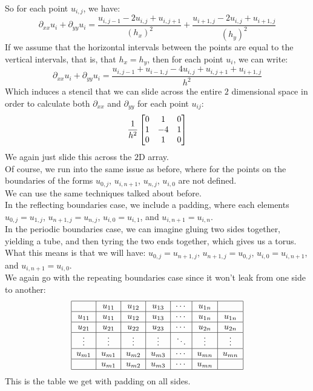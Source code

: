 \documentclass[12pt]{article}
\begin{document}
So for each point $u_{i, j}$, we have:
\[ \partial_{xx}u_i + \partial_{yy}u_i
= \dfrac{u_{i, j-1} -2u_{i, j} + u_{i, j+1}}{(h_x)^2} 
+ \dfrac{u_{i+1, j} -2u_{i, j} + u_{i+1, j}}{(h_y)^2} \]
If we assume that the horizontal intervals between 
the points are equal to the vertical intervals,
that is, that $h_x = h_y$,
then for each point $u_i$, we can write:
\[ \partial_{xx}u_i + \partial_{yy}u_i
= \dfrac{u_{i, j-1} + u_{i-1, j} -4u_{i, j} 
+ u_{i, j+1} + u_{i+1, j}}{h^2} \]
Which induces a stencil that we can slide
across the entire $2$ dimensional space
in order to calculate both $\partial_{xx}$
and $\partial_{yy}$ for each point $u_{ij}$:
\[ \dfrac{1}{h^2}
\begin{bmatrix} 0 & 1 & 0 \\ 1 & -4 & 1 \\ 0 & 1 & 0 \end{bmatrix} \]
We again just slide this across the $2$D array. \\

Of course, we run into the same issue as before,
where for the points on the boundaries
of the forms $u_{0, j}$, $u_{i, n+1}$,
$u_{n, j}$, $u_{i, 0}$ are not defined. \\
We can use the same techniques talked about before. \\
In the reflecting boundaries case,
we include a padding, where each elements
$u_{0, j} = u_{1, j}$, $u_{n+1, j} = u_{n, j}$,
$u_{i, 0} = u_{i, 1}$, and $u_{i, n+1} = u_{i, n}$. \\
In the periodic boundaries case,
we can imagine gluing two sides together,
yielding a tube, and then tyring the two ends together,
which gives us a torus. What this means is that
we will have:
$u_{0, j} = u_{n+1, j}$, $u_{n+1, j} = u_{0, j}$,
$u_{i, 0} = u_{i, n+1}$, and $u_{i, n+1} = u_{i, 0}$. \\

We again go with the repeating boundaries
case since it won't leak from one side to another:
\[ \begin{tabular}{|c|c|c|c|c|c|c|}
\hline
& $u_{11}$ & $u_{12}$ & $u_{13}$ & $\cdots$ 
& $u_{1n}$ & \\ \hline
$u_{11}$& $u_{11}$ & $u_{12}$ & $u_{13}$ & 
$\cdots$ & $u_{1n}$ & $u_{1n}$ \\ \hline
$u_{21}$& $u_{21}$ & $u_{22}$ & $u_{23}$ & 
$\cdots$ & $u_{2n}$ & $u_{2n}$ \\ \hline
$\vdots$ & $\vdots$ & $\vdots$ & $\vdots$ 
& $\ddots$ & $\vdots$ & $\vdots$ \\ \hline
$u_{m1}$& $u_{m1}$ & $u_{m2}$ & $u_{m3}$ & 
$\cdots$ & $u_{mn}$ & $u_{mn}$ \\ \hline
& $u_{m1}$ & $u_{m2}$ & $u_{m3}$ & $\cdots$ 
& $u_{mn}$ & \\
\hline \end{tabular} \]
This is the table we get with padding on all sides. \\
\end{document}
